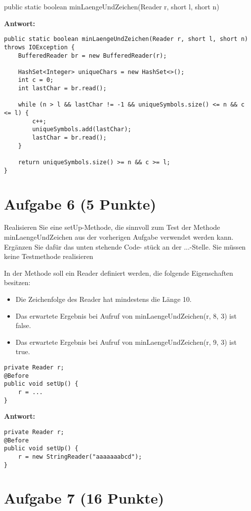 public static boolean minLaengeUndZeichen(Reader r, short l, short n) {

\textbf{Antwort:}

\begin{lstlisting}
public static boolean minLaengeUndZeichen(Reader r, short l, short n) throws IOException {
    BufferedReader br = new BufferedReader(r);

    HashSet<Integer> uniqueChars = new HashSet<>();
    int c = 0;
    int lastChar = br.read();

    while (n > l && lastChar != -1 && uniqueSymbols.size() <= n && c <= l) {
        c++;
        uniqueSymbols.add(lastChar);
        lastChar = br.read();
    }

    return uniqueSymbols.size() >= n && c >= l;
}
\end{lstlisting}

\section{Aufgabe 6 (5 Punkte)}

Realisieren Sie eine setUp-Methode, die sinnvoll zum Test der Methode
minLaengeUndZeichen aus der vorherigen Aufgabe verwendet werden kann. Ergänzen
Sie dafür das unten stehende Code- stück an der ...-Stelle. Sie müssen keine
Testmethode realisieren

In der Methode soll ein Reader definiert werden, die folgende Eigenschaften
besitzen:

\begin{itemize}
    \item Die Zeichenfolge des Reader hat mindestens die Länge 10.
    \item Das erwartete Ergebnis bei Aufruf von minLaengeUndZeichen(r, 8, 3) ist false.
    \item Das erwartete Ergebnis bei Aufruf von minLaengeUndZeichen(r, 9, 3) ist true.
\end{itemize}

\begin{lstlisting}
private Reader r;
@Before
public void setUp() {
    r = ...
}
\end{lstlisting}

\textbf{Antwort:}

\begin{lstlisting}
private Reader r;
@Before
public void setUp() {
    r = new StringReader("aaaaaaabcd");
}
\end{lstlisting}

\section{Aufgabe 7 (16 Punkte)}

}
